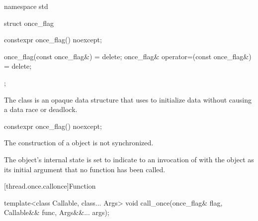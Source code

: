 %
\begin{codeblock}
namespace std {
  struct once_flag {
    constexpr once_flag() noexcept;

    once_flag(const once_flag&) = delete;
    once_flag& operator=(const once_flag&) = delete;
  };
}
\end{codeblock}

\pnum
The class  is an opaque data structure that  uses to
initialize data without causing a data race or deadlock.

%
\begin{itemdecl}
constexpr once_flag() noexcept;
\end{itemdecl}

\begin{itemdescr}
\pnum
\sync
The construction of a  object is not synchronized.

\pnum
\ensures
The object's internal state is set to indicate to an invocation of
 with the object as its initial argument that no function has been
called.
\end{itemdescr}

[thread.once.callonce]{Function }

%
\begin{itemdecl}
template<class Callable, class... Args>
  void call_once(once_flag& flag, Callable&& func, Args&&... args);
\end{itemdecl}

